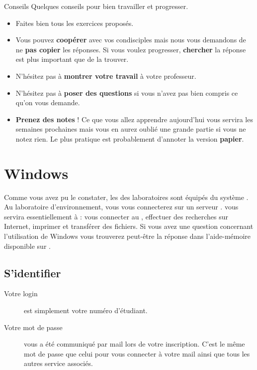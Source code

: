 \documentclass[a4paper,11pt]{style-esi/td}
\begin{document}
\entete
\titre
{}
\lastedit

\bigskip
\tableofcontents

\vfill
\begin{coltbox}{Conseils}
	Quelques conseils pour bien travailler et progresser.
	\begin{itemize}
	\item 
		Faites bien tous les exercices proposés.
	\item 
		Vous pouvez \textbf{coopérer} avec vos condisciples 
		mais nous vous demandons de ne \textbf{pas copier} les réponses. 
		Si vous voulez progresser, \textbf{chercher} la réponse est plus important que de la trouver. 
	\item 
		N'hésitez pas à \textbf{montrer votre travail} à votre professeur.
	\item 
		N'hésitez pas à \textbf{poser des questions} 
		si vous n'avez pas bien compris ce qu'on vous demande.
	\item 
		\textbf{Prenez des notes} ! 
		Ce que vous allez apprendre aujourd'hui 
		vous servira les semaines prochaines 
		mais vous en aurez oublié une grande partie si vous ne notez rien. 
		Le plus pratique est probablement d'annoter la version \textbf{papier}. 
	\end{itemize}
\end{coltbox}
\vfill

\newpage
\section{Windows}

	Comme vous avez pu le constater, 
	les  des laboratoires sont équipés du système .
	Au laboratoire d'environnement, vous vous connecterez sur un serveur . 
	 vous servira essentiellement à : vous connecter au , 
	effectuer des recherches sur Internet, imprimer et transférer des fichiers.
	Si vous avez une question concernant l'utilisation de Windows 
	vous trouverez peut-être la réponse dans l'aide-mémoire disponible sur . 		

	\subsection{S'identifier}

		\begin{infobox}
			\begin{description}
				\item[Votre login]
					est simplement votre numéro d'étudiant.
				\item[Votre mot de passe]
					vous a été communiqué par mail lors de votre inscription.
					C'est le même mot de passe que celui pour vous connecter
					à votre mail  ainsi que tous les autres service associés.
				\end{description}	
		\end{infobox}
\end{document}
